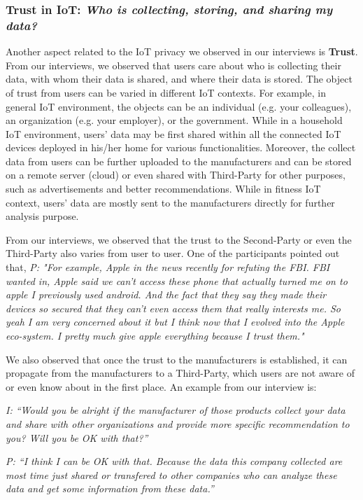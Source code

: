 \subsubsection{Trust in IoT: \textit{Who is collecting, storing, and sharing my data?}}
Another aspect related to the IoT privacy we observed in our interviews is \textbf{Trust}. From our interviews, we observed that users care about who is collecting their data, with whom their data is shared, and where their data is stored. The object of trust from users can be varied in different IoT contexts. For example, in general IoT environment, the objects can be an individual (e.g. your colleagues), an organization (e.g. your employer), or the government. While in a household IoT environment, users' data may be first shared within all the connected IoT devices deployed in his/her home for various functionalities. Moreover, the collect data from users can be further uploaded to the manufacturers and can be stored on a remote server (cloud) or even shared with Third-Party for other purposes, such as advertisements and better recommendations. While in fitness IoT context, users' data are mostly sent to the manufacturers directly for further analysis purpose.

From our interviews, we observed that the trust to the Second-Party or even the Third-Party also varies from user to user. One of the participants pointed out that, \textit{P: "For example, Apple in the news recently for refuting the FBI. FBI wanted in, Apple said we can't access these phone that actually turned me on to apple I previously used android. And the fact that they say they made their devices so secured that they can't even access them that really interests me. So yeah I am very concerned about it but I think now that I evolved into the Apple eco-system. I pretty much give apple everything because I trust them."}



We also observed that once the trust to the manufacturers is established, it can propagate from the manufacturers to a Third-Party, which users are not aware of or even know about in the first place. An example from our interview is:

\textit{I: ``Would you be alright if the manufacturer of those products collect your data and share with other organizations and provide more specific recommendation to you? Will you be OK with that?''\\}

\textit{P: ``I think I can be OK with that. Because the data this company collected are most time just shared or transfered to other companies who can analyze these data and get some information from these data.''\\}

